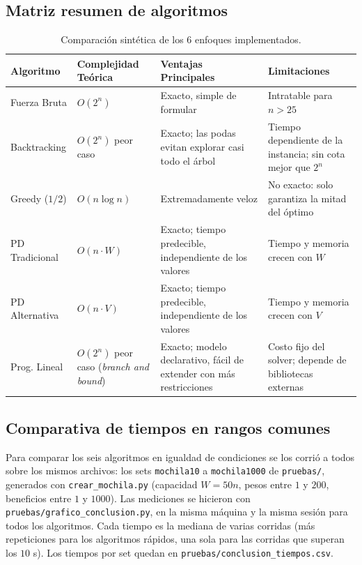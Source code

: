 \documentclass[11pt,a4paper]{article}
\begin{document}
\subsection{Matriz resumen de algoritmos}

\begin{table}[h]
    \centering
    \begin{tabular}{lp{3.5cm}p{4cm}p{3.5cm}}
        \toprule
        \textbf{Algoritmo} & \textbf{Complejidad Teórica} & \textbf{Ventajas Principales} & \textbf{Limitaciones} \\
        \midrule
        Fuerza Bruta & $O(2^n)$ & Exacto, simple de formular & Intratable para $n > 25$ \\
        Backtracking & $O(2^n)$ peor caso & Exacto; las podas evitan explorar casi todo el árbol & Tiempo dependiente de la instancia; sin cota mejor que $2^n$ \\
        Greedy ($1/2$) & $O(n \log n)$ & Extremadamente veloz & No exacto: solo garantiza la mitad del óptimo \\
        PD Tradicional & $O(n \cdot W)$ & Exacto; tiempo predecible, independiente de los valores & Tiempo y memoria crecen con $W$ \\
        PD Alternativa & $O(n \cdot V)$ & Exacto; tiempo predecible, independiente de los valores & Tiempo y memoria crecen con $V$ \\
        Prog. Lineal & $O(2^n)$ peor caso (\textit{branch and bound}) & Exacto; modelo declarativo, fácil de extender con más restricciones & Costo fijo del solver; depende de bibliotecas externas \\
        \bottomrule
    \end{tabular}
    \caption{Comparación sintética de los 6 enfoques implementados.}
\end{table}

\subsection{Comparativa de tiempos en rangos comunes}
\label{sec:conclusion_tiempos}

Para comparar los seis algoritmos en igualdad de condiciones se los corrió a todos sobre los mismos archivos: los sets \texttt{mochila10} a \texttt{mochila1000} de \texttt{pruebas/}, generados con \texttt{crear\_mochila.py} (capacidad $W = 50n$, pesos entre $1$ y $200$, beneficios entre $1$ y $1000$). Las mediciones se hicieron con \texttt{pruebas/grafico\_conclusion.py}, en la misma máquina y la misma sesión para todos los algoritmos. Cada tiempo es la mediana de varias corridas (más repeticiones para los algoritmos rápidos, una sola para las corridas que superan los $10$ s). Los tiempos por set quedan en \texttt{pruebas/conclusion\_tiempos.csv}.
\end{document}
